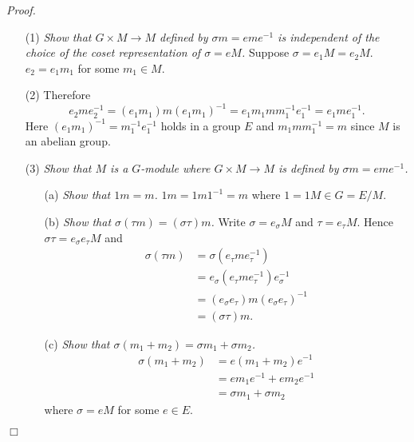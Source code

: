 \documentclass{article}
\begin{document}
\emph{Proof.}
\begin{enumerate}
\item[(1)]
  \emph{Show that $G \times M \to M$ defined by $\sigma m = eme^{-1}$
  is independent of the choice of the coset representation of $\sigma = eM$.}
  Suppose $\sigma = e_1 M = e_2 M$.
  $e_2 = e_1 m_1$ for some $m_1 \in M$.

\item[(2)]
  Therefore
  \[
    e_2 m e_2^{-1}
    = (e_1 m_1)m(e_1 m_1)^{-1}
    = e_1 m_1 m m_1^{-1} e_1^{-1}
    = e_1 m e_1^{-1}.
  \]
  Here $(e_1 m_1)^{-1} = m_1^{-1} e_1^{-1}$ holds in a group $E$
  and $m_1 m m_1^{-1} = m$ since $M$ is an abelian group.

\item[(3)]
  \emph{Show that $M$ is a $G$-module where
  $G \times M \to M$ is defined by $\sigma m = eme^{-1}$.}
  \begin{enumerate}
  \item[(a)]
    \emph{Show that $1m = m$.}
    $1m = 1m1^{-1} = m$ where $1 = 1M \in G = E/M$.
    
  \item[(b)]
    \emph{Show that $\sigma(\tau m) = (\sigma\tau) m$.}
    Write $\sigma = e_{\sigma} M$ and $\tau = e_{\tau} M$.
    Hence $\sigma \tau = e_{\sigma} e_{\tau} M$
    and
    \begin{align*}
      \sigma(\tau m)
      &= \sigma(e_{\tau} m e_{\tau}^{-1}) \\
      &= e_{\sigma}(e_{\tau} m e_{\tau}^{-1})e_{\sigma}^{-1} \\
      &= (e_{\sigma}e_{\tau}) m (e_{\sigma}e_{\tau})^{-1} \\
      &= (\sigma \tau)m.
    \end{align*}

  \item[(c)]
    \emph{Show that $\sigma(m_1 + m_2) = \sigma m_1 + \sigma m_2$.}
    \begin{align*}
      \sigma (m_1 + m_2)
      &= e(m_1 + m_2)e^{-1} \\
      &= em_1e^{-1} + em_2e^{-1} \\
      &= \sigma m_1 + \sigma m_2
    \end{align*}
    where $\sigma = eM$ for some $e \in E$.
  \end{enumerate}
\end{enumerate}
$\Box$ \\\\
\end{document}
